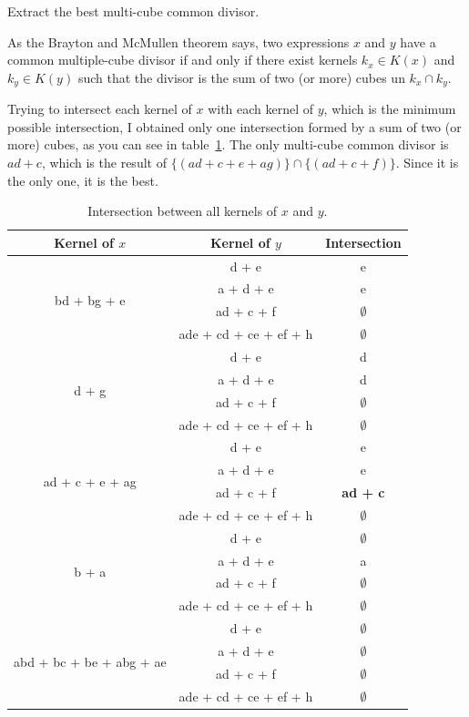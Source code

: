 \documentclass[a4paper, 10pt]{article}
\begin{document}
{\color{statement} Extract the best multi-cube common divisor.}

As the Brayton and McMullen theorem says, two expressions $x$ and $y$ have a common multiple-cube divisor if and only if there exist kernels $k_x \in K(x)$ and $k_y \in K(y)$ such that the divisor is the sum of two (or more) cubes un $k_x \cap k_y$. 

Trying to intersect each kernel of $x$ with each kernel of $y$, which is the minimum possible intersection, I obtained only one intersection formed by a sum of two  (or more) cubes, as you can see in table~\ref{tab:intersections}. The only multi-cube common divisor is $ad + c$, which is the result of $\{(ad + c + e + ag)\} \cap \{(ad + c + f)\}$. Since it is the only one, it is the best.
\begin{table}[hbtp]
    \centering
    \begin{tabular}{|c c | c |}
        \hline
        Kernel of $x$ & Kernel of $y$ & Intersection \\ \hline
        \multirow{4}{*}{bd + bg + e } & d + e & e \\
        & a + d + e & e \\
        & ad + c + f & $\emptyset$ \\
        & ade + cd + ce + ef + h & $\emptyset$ \\ \hline
        \multirow{4}{*}{d + g} & d + e & d \\
        & a + d + e & d \\
        & ad + c + f &  $\emptyset$ \\
        & ade + cd + ce + ef + h & $\emptyset$ \\ \hline
        \multirow{4}{*}{ad + c + e + ag} & d + e & e \\
        & a + d + e & e \\
        & ad + c + f & \textbf{ad + c}\\
        & ade + cd + ce + ef + h & $\emptyset$ \\ \hline
        \multirow{4}{*}{b + a} & d + e & $\emptyset$ \\
        & a + d + e & a \\
        & ad + c + f & $\emptyset$ \\
        & ade + cd + ce + ef + h & $\emptyset$ \\ \hline
        \multirow{4}{*}{abd + bc + be + abg + ae} & d + e & $\emptyset$ \\
        & a + d + e & $\emptyset$ \\
        & ad + c + f & $\emptyset$ \\
        & ade + cd + ce + ef + h & $\emptyset$ \\
        \hline
    \end{tabular}
    \caption{Intersection between all kernels of $x$ and $y$.}
    \label{tab:intersections}
\end{table}
\end{document}
